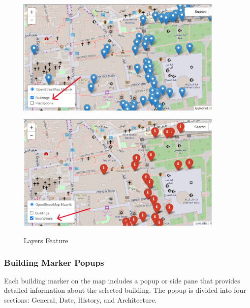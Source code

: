 \begin{figure}[H]
    \centering
    \begin{minipage}[c]{.5\linewidth}
        \centering
        \includegraphics[width=0.9\textwidth]{Images/building_layer.png}
        \label{fig:build_layer}
    \end{minipage}\hfill
    \begin{minipage}[c]{.5\linewidth}
        \centering
        \includegraphics[width=0.9\textwidth]{Images/insc_layer.png}
        \label{fig:insc_layer}
    \end{minipage}
    \caption{Layers Feature}
    \label{fig:layers}
\end{figure}

\subsubsection{Building Marker Popups}

Each building marker on the map includes a popup or side pane that provides detailed information about the selected building. The popup is divided into four sections: General, Date, History, and Architecture.


